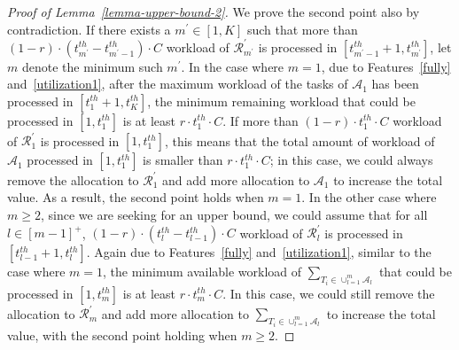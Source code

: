 \documentclass[10pt,journal,compsoc]{IEEEtran}
\begin{document}
\begin{proof}[Proof of Lemma~\ref{lemma-upper-bound-2}]
We prove the second point also by contradiction. If there exists a $m^{\prime}\in [1, K]$ such that more than $(1-r)\cdot(t_{m^{\prime}}^{th}-t_{m^{\prime}-1}^{th})\cdot C$ workload of $\mathcal{R}_{m^{\prime}}^{\prime}$ is processed in $[t_{m^{\prime}-1}^{th}+1, t_{m^{\prime}}^{th}]$, let $m$ denote the minimum such $m^{\prime}$. In the case where $m=1$, due to Features~\ref{fully} and~\ref{utilization1}, after the maximum workload of the tasks of $\mathcal{A}_{1}$ has been processed in $[t_{1}^{th}+1, t_{K}^{th}]$, the minimum remaining workload that could be processed in $[1, t_{1}^{th}]$ is at least $r\cdot t_{1}^{th}\cdot C$. If more than $(1-r)\cdot t_{1}^{th}\cdot C$ workload of $\mathcal{R}_{1}^{\prime}$ is processed in $[1, t_{1}^{th}]$, this means that the total amount of workload of $\mathcal{A}_{1}$ processed in $[1, t_{1}^{th}]$ is smaller than $r\cdot t_{1}^{th} \cdot C$; in this case, we could always remove the allocation to $\mathcal{R}_{1}^{\prime}$ and add more allocation to $\mathcal{A}_{1}$ to increase the total value. As a result, the second point holds when $m=1$. In the other case where $m\geq 2$, since we are seeking for an upper bound, we could assume that for all $l\in [m-1]^{+}$, $(1-r)\cdot(t_{l}^{th}-t_{l-1}^{th})\cdot C$ workload of $\mathcal{R}_{l}^{\prime}$ is processed in $[t_{l-1}^{th}+1, t_{l}^{th}]$. Again due to Features~\ref{fully} and~\ref{utilization1}, similar to the case where $m=1$, the minimum available workload of $\sum_{T_{i}\in \cup_{l=1}^{m}{\mathcal{A}_{l}}}$ that could be processed in $[1, t_{m}^{th}]$ is at least $r\cdot t_{m}^{th} \cdot C$. In this case, we could still remove the allocation to $\mathcal{R}_{m}^{\prime}$ and add more allocation to $\sum_{T_{i}\in \cup_{l=1}^{m}{\mathcal{A}_{l}}}$ to increase the total value, with the second point holding when $m\geq 2$.
\end{proof}
\end{document}
